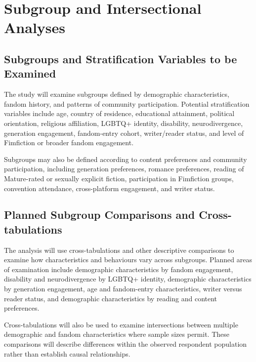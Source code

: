 \section{Subgroup and Intersectional Analyses}

\subsection{Subgroups and Stratification Variables to be Examined}

The study will examine subgroups defined by demographic characteristics, fandom history, and patterns of community participation. Potential stratification variables include age, country of residence, educational attainment, political orientation, religious affiliation, LGBTQ+ identity, disability, neurodivergence, generation engagement, fandom-entry cohort, writer/reader status, and level of Fimfiction or broader fandom engagement.

Subgroups may also be defined according to content preferences and community participation, including generation preferences, romance preferences, reading of Mature-rated or sexually explicit fiction, participation in Fimfiction groups, convention attendance, cross-platform engagement, and writer status.


\subsection{Planned Subgroup Comparisons and Cross-tabulations}


The analysis will use cross-tabulations and other descriptive comparisons to examine how characteristics and behaviours vary across subgroups. Planned areas of examination include demographic characteristics by fandom engagement, disability and neurodivergence by LGBTQ+ identity, demographic characteristics by generation engagement, age and fandom-entry characteristics, writer versus reader status, and demographic characteristics by reading and content preferences.

Cross-tabulations will also be used to examine intersections between multiple demographic and fandom characteristics where sample sizes permit. These comparisons will describe differences within the observed respondent population rather than establish causal relationships.

